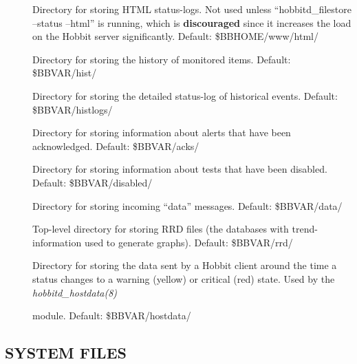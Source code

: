 \begin{description}
 

\item[] Directory for storing HTML status-logs. Not used unless
  ``hobbitd\_filestore --status --html'' is running, which is
  \textbf{discouraged} since it increases the load on the Hobbit
  server significantly. Default: \$BBHOME/www/html/ 


 

\item[] Directory for storing the history of monitored items. Default: \$BBVAR/hist/ 

 

\item[] Directory for storing the detailed status-log of
  historical events. Default: \$BBVAR/histlogs/ 


 

\item[] Directory for storing information about alerts that have been acknowledged. Default: \$BBVAR/acks/ 

 

\item[] Directory for storing information about tests that have been disabled. Default: \$BBVAR/disabled/ 

 

\item[] Directory for storing incoming ``data'' messages. Default: \$BBVAR/data/ 

 

\item[] Top-level directory for storing RRD files (the databases
  with trend-information used to generate graphs). Default:
  \$BBVAR/rrd/ 


 

\item[] Directory for storing the data sent by a Hobbit
  client around the time a status changes to a warning (yellow) or
  critical (red) state. Used by the \emph{hobbitd\_hostdata(8)}

 module. Default: \$BBVAR/hostdata/ 

 


 


\end{description}

\subsection{SYSTEM FILES}


